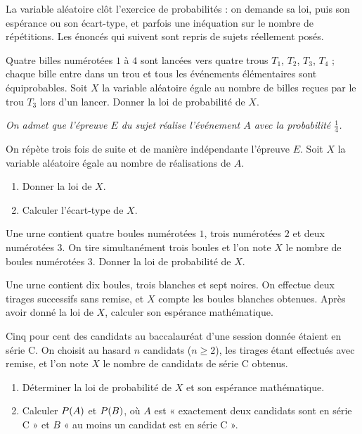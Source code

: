 \begin{annales}
La variable aléatoire clôt l'exercice de probabilités : on demande sa loi,
puis son espérance ou son écart-type, et parfois une inéquation sur le nombre
de répétitions. Les énoncés qui suivent sont repris de sujets réellement
posés.

Quatre billes numérotées $1$ à $4$ sont lancées vers quatre trous $T_{1}$,
$T_{2}$, $T_{3}$, $T_{4}$ ; chaque bille entre dans un trou et tous les
événements élémentaires sont équiprobables. Soit $X$ la variable aléatoire
égale au nombre de billes reçues par le trou $T_{3}$ lors d'un lancer. Donner
la loi de probabilité de $X$.

\emph{On admet que l'épreuve $E$ du sujet réalise l'événement $A$ avec la
probabilité $\frac14$.}

On répète trois fois de suite et de manière indépendante l'épreuve $E$. Soit
$X$ la variable aléatoire égale au nombre de réalisations de $A$.
\begin{enumerate}[label=\textbf{\alph*)}, leftmargin=*, itemsep=0.15em]
  \item Donner la loi de $X$.
  \item Calculer l'écart-type de $X$.
\end{enumerate}

Une urne contient quatre boules numérotées $1$, trois numérotées $2$ et deux
numérotées $3$. On tire simultanément trois boules et l'on note $X$ le nombre
de boules numérotées $3$. Donner la loi de probabilité de $X$.

Une urne contient dix boules, trois blanches et sept noires. On effectue deux
tirages successifs sans remise, et $X$ compte les boules blanches obtenues.
Après avoir donné la loi de $X$, calculer son espérance mathématique.

Cinq pour cent des candidats au baccalauréat d'une session donnée étaient en
série C. On choisit au hasard $n$ candidats ($n \geq 2$), les tirages étant
effectués avec remise, et l'on note $X$ le nombre de candidats de série C
obtenus.
\begin{enumerate}[label=\textbf{\alph*)}, leftmargin=*, itemsep=0.15em]
  \item Déterminer la loi de probabilité de $X$ et son espérance
        mathématique.
  \item Calculer $P\!\left(A\right)$ et $P\!\left(B\right)$, où $A$ est « exactement deux
        candidats sont en série C » et $B$ « au moins un candidat est en série
        C ».
\end{enumerate}


\end{annales}
